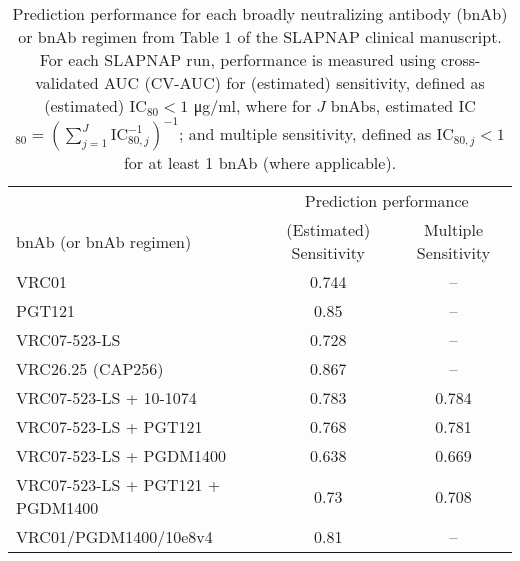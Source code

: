 \documentclass[10pt]{article}
\begin{document}
\begin{table}
    \centering
    \caption{Prediction performance for each broadly neutralizing antibody (bnAb) or bnAb regimen from Table 1 of the SLAPNAP clinical manuscript. For each SLAPNAP run, performance is measured using cross-validated AUC (CV-AUC) for (estimated) sensitivity, defined as (estimated) IC$_{80} < 1$ \si{\ug}/ml, where for $J$ bnAbs, estimated IC$_{80} = \left(\sum_{j=1}^J \text{IC}_{80,j}^{-1}\right)^{-1}$; and multiple sensitivity, defined as $\text{IC}_{80,j} < 1$ for at least 1 bnAb (where applicable).}
    \begin{tabular}{l|cc}
        & \multicolumn{2}{c}{Prediction performance} \\
        bnAb (or bnAb regimen) & (Estimated) Sensitivity & Multiple Sensitivity \\
        \hline
        VRC01 & 0.744 & -- \\
        PGT121 & 0.85 & -- \\
        VRC07-523-LS & 0.728 & --\\
        VRC26.25 (CAP256) & 0.867 & --\\
        VRC07-523-LS + 10-1074 & 0.783 & 0.784 \\
        VRC07-523-LS + PGT121 & 0.768 & 0.781 \\
        VRC07-523-LS + PGDM1400 & 0.638 & 0.669 \\
        VRC07-523-LS + PGT121 + PGDM1400 & 0.73 & 0.708 \\
        VRC01/PGDM1400/10e8v4 & 0.81 & --
    \end{tabular}
    \label{tab:perf-binary}
\end{table}
\end{document}
